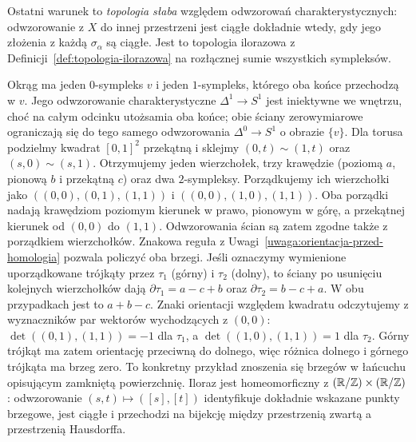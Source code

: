 Ostatni warunek to \emph{topologia słaba}
względem odwzorowań charakterystycznych:
odwzorowanie z $X$ do innej przestrzeni
jest ciągłe dokładnie wtedy, gdy jego
złożenia z każdą $\sigma_\alpha$ są ciągłe.
Jest to topologia ilorazowa z
Definicji~\ref{def:topologia-ilorazowa}
na rozłącznej sumie wszystkich sympleksów.

\begin{przyklad}
\label{prz:delta-torus}
Okrąg ma jeden $0$-sympleks $v$
i jeden $1$-sympleks, którego oba końce
przechodzą w $v$. Jego odwzorowanie charakterystyczne
$\Delta^1\to S^1$ jest iniektywne we wnętrzu,
choć na całym odcinku utożsamia oba końce;
obie ściany zerowymiarowe ograniczają się do
tego samego odwzorowania $\Delta^0\to S^1$
o obrazie $\{v\}$.
Dla torusa
podzielmy kwadrat $[0,1]^2$
przekątną i sklejmy
$(0,t)\sim(1,t)$ oraz
$(s,0)\sim(s,1)$. Otrzymujemy
jeden wierzchołek, trzy krawędzie
(poziomą $a$, pionową $b$ i przekątną
$c$) oraz dwa $2$-sympleksy. Porządkujemy ich wierzchołki jako
$((0,0),(0,1),(1,1))$ i $((0,0),(1,0),(1,1))$.
Oba porządki nadają krawędziom poziomym kierunek w prawo,
pionowym w górę, a przekątnej kierunek od $(0,0)$ do $(1,1)$.
Odwzorowania ścian są zatem zgodne także z porządkiem wierzchołków.
Znakowa reguła z Uwagi~\ref{uwaga:orientacja-przed-homologia}
pozwala policzyć oba brzegi. Jeśli oznaczymy wymienione
uporządkowane trójkąty przez $\tau_1$ (górny) i $\tau_2$ (dolny),
to ściany po usunięciu kolejnych wierzchołków dają
$\partial\tau_1=a-c+b$ oraz $\partial\tau_2=b-c+a$.
W obu przypadkach jest to $a+b-c$.
Znaki orientacji względem kwadratu odczytujemy z wyznaczników
par wektorów wychodzących z $(0,0)$:
$\det((0,1),(1,1))=-1$ dla $\tau_1$,
a $\det((1,0),(1,1))=1$ dla $\tau_2$.
Górny trójkąt ma zatem orientację przeciwną do dolnego,
więc różnica dolnego i górnego trójkąta ma brzeg zero.
To konkretny przykład znoszenia się brzegów
w łańcuchu opisującym zamkniętą powierzchnię.
Iloraz jest homeomorficzny z
$(\mathbb{R}/\mathbb{Z})\times(\mathbb{R}/\mathbb{Z})$:
odwzorowanie $(s,t)\mapsto([s],[t])$
identyfikuje dokładnie wskazane
punkty brzegowe, jest ciągłe
i przechodzi na bijekcję
między przestrzenią zwartą
a przestrzenią Hausdorffa.
\end{przyklad}


